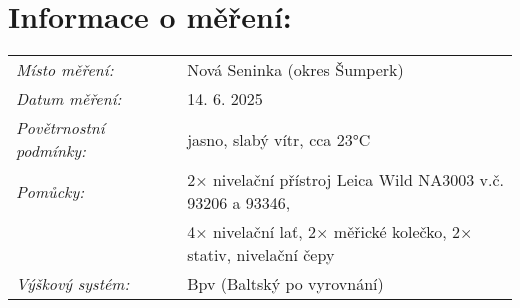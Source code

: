 \section{Informace o měření:}
\begin{tabular}{lll} 
\textit{Místo měření:} & & Nová Seninka (okres Šumperk)\\ 
\textit{Datum měření:} & & 14. 6. 2025\\
\textit{Povětrnostní podmínky:} & & jasno, slabý vítr, cca 23°C\\ 
\textit{Pomůcky:} & & 2× nivelační přístroj Leica Wild NA3003 v.č. 93206 a 93346,\\ 
& & 4× nivelační lať, 2× měřické kolečko, 2× stativ, nivelační čepy\\
\textit{Výškový systém:} & & Bpv (Baltský po vyrovnání)\\ 
\end{tabular}
